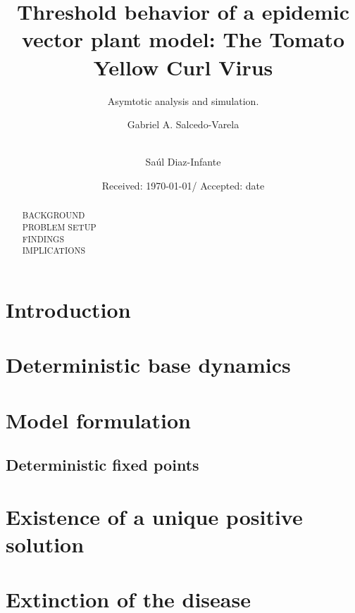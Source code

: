 \documentclass[smallextended]{svjour3}
\begin{document}
	\title{%
		Threshold behavior of a epidemic vector plant model:
		The Tomato Yellow Curl Virus
	}
	\subtitle{%
		Asymtotic analysis and simulation.
	}
	\author{%
		Gabriel A. Salcedo-Varela  \and 
		\\
		Sa\'ul Diaz-Infante 
	}
	\date{Received: \today / Accepted: date}
	\maketitle
	\begin{abstract}
		BACKGROUND
		\\
		PROBLEM SETUP
		\\
		FINDINGS 
		\\
		IMPLICATIONS
	\end{abstract}
	\section{Introduction}
	\section{Deterministic base dynamics}
		\label{sec:model_formulation}
		\section{Model formulation}
		
		\subsection{Deterministic fixed points}
			
	\section{Existence of a unique positive solution}
		\label{sec:solution_existence}
		
	\section{Extinction of the disease}
		\label{extinction}
		
		
\end{document}
